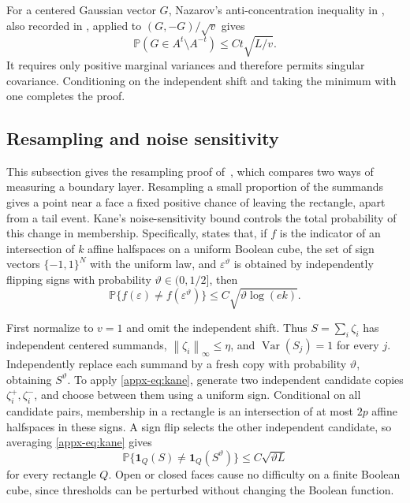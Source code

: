 \documentclass[11pt,letterpaper]{article}
\newif\ifshowpolish
\newif\ifshowrev
\newcommand{\rev}[1]{\ifshowrev{\color{revblue}%
\hypersetup{linkcolor=revblue,citecolor=revblue,urlcolor=revblue}#1}\else#1\fi}
\newcommand{\rs}[1]{\ifshowrev{\color{revblue}#1}\else#1\fi}
\newif\ifshownat
\newcommand{\nat}[1]{\ifshownat{\color{revblue}%
\hypersetup{linkcolor=revblue,citecolor=revblue,urlcolor=revblue}#1}\else#1\fi}
\newcommand{\nas}[1]{\ifshownat{\color{revblue}#1}\else#1\fi}
\theoremstyle{remark}
\newcommand{\Pp}{\mathbb P}
\newcommand{\Var}{\operatorname{Var}}
\newcommand{\norm}[1]{\left\lVert#1\right\rVert}
\newcommand{\ind}{\mathbf 1}
\begin{document}
For a centered Gaussian vector \(G\), Nazarov's \rev{anti-concentration}
inequality in
\cite[Lemma~A.1]{CCK2017}, also recorded in
\cite[Lemma~J.3]{CCKK2022}, applied to \((G,-G)/\sqrt v\) gives
\[
 \Pp(G\in A^{\rs t}\setminus A^{-\rs t})\le C\rs t\sqrt{L/v}.
\]
It requires only positive marginal variances and therefore permits
singular covariance. Conditioning on the independent shift and taking
the minimum with one completes the proof.


\begingroup
\ifshowpolish
\color{magenta}
\hypersetup{linkcolor=magenta,citecolor=magenta,urlcolor=magenta}
\fi
\subsection{\texorpdfstring{\nas{Resampling and noise sensitivity}}{Resampling and noise sensitivity}}
\label{appx-conc:resampling}

\rev{This subsection gives \nat{the resampling proof of~\cite[Lemma~2.1]{AL}}, which compares two ways of measuring a
boundary layer.} Resampling a small
proportion of the \rs{summands} gives a point near a face a fixed positive chance
of leaving the rectangle, apart from a tail event. Kane's noise-sensitivity
bound controls the total probability of this change in membership.
Specifically, \cite[Corollary~4 in the arXiv version]{Kane} states that,
if \(f\) is the indicator of an intersection
of \(k\) affine halfspaces on a uniform Boolean cube\rev{, the set of
sign vectors \(\{-1,1\}^N\) with the uniform law}, and
\(\varepsilon^{\rs\vartheta}\) is obtained by independently flipping signs
with probability \(\rs\vartheta\in(0,1/2]\), then
\begin{equation}
 \Pp\{f(\varepsilon)\ne f(\varepsilon^{\rs\vartheta})\}
 \le C\sqrt{\rs\vartheta\log(ek)}.
 \label{appx-eq:kane}
\end{equation}

First normalize to \(v=1\) and omit the independent shift. Thus
\(S=\sum_i\zeta_i\) has independent centered \rs{summands},
\(\norm{\zeta_i}_\infty\le\eta\), and \(\Var(S_j)=1\) for every \(j\).
Independently replace each \rs{summand} by a fresh copy with probability
\(\rs\vartheta\), obtaining \(S^{\rs\vartheta}\).
To apply \eqref{appx-eq:kane}, generate two independent candidate copies
\(\zeta_i^+,\zeta_i^-\), and choose between them using a uniform sign.
Conditional on all candidate pairs, membership in a rectangle is an
intersection of at most \(2p\) affine halfspaces in these signs.
A sign flip selects the other independent candidate, so averaging
\eqref{appx-eq:kane} gives
\begin{equation}
 \Pp\{\ind_Q(S)\ne\ind_Q(S^{\rs\vartheta})\}
 \le C\sqrt{\rs\vartheta L}
 \label{appx-eq:resampling}
\end{equation}
for every rectangle \(Q\). Open or closed faces cause no difficulty on
a finite Boolean cube, since thresholds can be perturbed without changing
the Boolean function.
\end{document}
